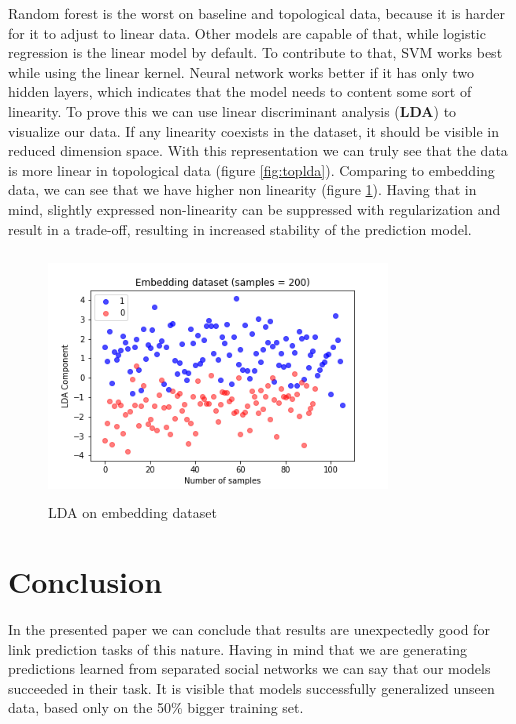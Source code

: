 \documentclass[9pt,twocolumn,twoside]{pnas-new}
\begin{document}
Random forest is the worst on baseline and topological data, because it is harder for it to adjust to linear data. Other models are capable of that, while logistic regression is the linear model by default. To contribute to that, SVM works best while using the linear kernel. Neural network works better if it has only two hidden layers, which indicates that the model needs to content some sort of linearity. To prove this we can use linear discriminant analysis (\textbf{LDA}) to visualize our data. If any linearity coexists in the dataset, it should be visible in reduced dimension space. With this representation we can truly see that the data is more linear in topological data (figure \ref{fig:toplda}). Comparing to embedding data, we can see that we have higher non linearity (figure \ref{fig:emblda}). Having that in mind, slightly expressed non-linearity can be suppressed with regularization and result in a trade-off, resulting in increased stability of the prediction model.



\begin{figure}[h]%
\centering
\includegraphics[width=9cm, height=6.5cm]{emblda.png}
\caption{LDA on embedding dataset}
\label{fig:emblda}
\end{figure}






\section*{Conclusion}

In the presented paper we can conclude that results are unexpectedly good for link prediction tasks of this nature. Having in mind that we are generating predictions learned from separated social networks we can say that our models succeeded in their task. It is visible that models successfully generalized unseen data, based only on the 50\% bigger training set.
\end{document}
